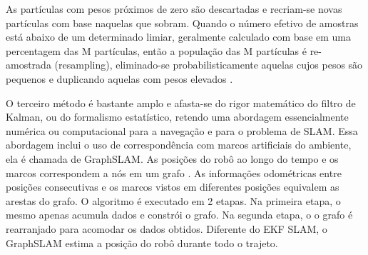 As partículas com pesos próximos de zero são descartadas e recriam-se novas partículas com base naquelas que sobram. Quando o
número efetivo de amostras está abaixo de um determinado limiar, geralmente calculado
com base em uma percentagem das M partículas, então a população das M partículas é
re-amostrada (resampling), eliminado-se probabilisticamente aquelas cujos pesos são pequenos
e duplicando aquelas com pesos elevados \cite{slam4}.

O terceiro método é bastante amplo e afasta-se do rigor matemático do filtro de
Kalman, ou do formalismo estatístico, retendo uma abordagem essencialmente numérica ou
computacional para a navegação e para o problema de SLAM. Essa abordagem inclui o uso
de correspondência com marcos artificiais do ambiente\cite{construcaoMapas}, ela é chamada de GraphSLAM.
As posições do robô ao longo do tempo e os marcos correspondem a nós em um grafo \cite{slam2}. 
As informações odométricas entre posições consecutivas e os marcos vistos em diferentes posições equivalem as arestas do
grafo. O algoritmo é executado em 2 etapas. Na primeira etapa, o mesmo apenas acumula dados e
constrói o grafo. Na segunda etapa, o o grafo é rearranjado para acomodar
os dados obtidos. Diferente do EKF SLAM, o GraphSLAM estima a posição do robô durante todo o trajeto.

